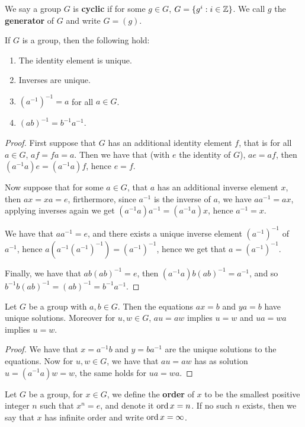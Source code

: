 \begin{definition}
    We say a group $G$ is \textbf{cyclic} if for some $g \in G$,  $G=\{g^i:i \in \mathbb{Z}\}$. We call $g$
    the \textbf {generator} of $G$ and write  $G=(g)$.
\end{definition}

\begin{lemma}\label{1.1.1}
    If $G$ is a group, then the following hold:
        \begin{enumerate}[label=(\arabic*)]
            \item The identity element is unique.

            \item Inverses are unique.

            \item  $(a^{-1})^{-1}=a$ for all $a \in G$.

            \item  $(ab)^{-1}=b^{-1}a^{-1}$.
        \end{enumerate}
\end{lemma}
\begin{proof}
    First suppose that $G$ has an additional identity element  $f$, that is for all $a \in G$,
    $af=fa=a$. Then we have that  (with $e$ the identity of  $G$), $ae=af$, then
    $(a^{-1}a)e=(a^{-1}a)f$, hence $e=f$.

    Now suppose that for some  $a \in G$, that  $a$ has an additional inverse element  $x$, then
    $ax=xa=e$, firthermore, since  $a^{-1}$ is the inverse of $a$, we have  $aa^{-1}=ax$, applying
    inverses again we get $(a^{-1}a)a^{-1}=(a^{-1}a)x$, hence $a^{-1}=x$.

    We have that $aa^{-1}=e$, and there exists a unique inverse element $(a^{-1})^{-1}$ of $a^{-1}$,
    hence $a(a^{-1}(a^{-1})^{-1})=(a^{-1})^{-1}$, hence we get that $a=(a^{-1})^{-1}$.

    Finally, we have that $ab(ab)^{-1}=e$, then $(a^{-1}a)b(ab)^{-1}=a^{-1}$, and so
    $b^{-1}b(ab)^{-1}=(ab)^{-1}=b^{-1}a^{-1}$.
\end{proof}

\begin{lemma}\label{1.1.2}
    Let $G$ be a group with  $a,b \in G$. Then the equations  $ax=b$ and  $ya=b$ have unique
    solutions. Moreover for $u,w \in G$,  $au=aw$ implies  $u=w$ and  $ua=wa$ implies  $u=w$.
\end{lemma}
\begin{proof}
    We have that $x=a^{-1}b$ and $y=ba^{-1}$ are the unique solutions to the equations. Now for $u,w
    \in G$, we have that  $au=aw$ has as solution  $u=(a^{-1}a)w=w$, the same holds for $ua=wa$.
\end{proof}

\begin{definition}
    Let $G$ be a group, for  $x \in G$, we define the \textbf{order} of $x$ to be the smallest
    positive integer $n$ such that  $x^n=e$, and denote it $\operatorname{ord}{x}=n$. If no such $n$ exists, then
    we say that $x$ has infinite order and write $\operatorname{ord}{x}=\infty$.
\end{definition}
